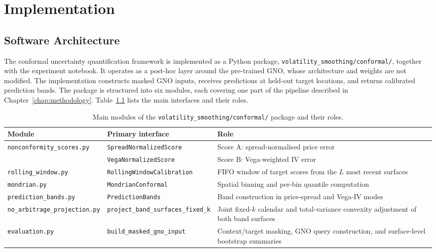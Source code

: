 \chapter{Implementation}
\label{chap:implementation}

\section{Software Architecture}
\label{sec:impl_architecture}

The conformal uncertainty quantification framework is implemented as a Python package, \texttt{volatility\_smoothing/conformal/}, together with the experiment notebook. It operates as a post-hoc layer around the pre-trained GNO, whose architecture and weights are not modified. The implementation constructs masked GNO inputs, receives predictions at held-out target locations, and returns calibrated prediction bands. The package is structured into six modules, each covering one part of the pipeline described in Chapter~\ref{chap:methodology}. Table~\ref{tab:modules} lists the main interfaces and their roles.

\begin{table}[ht]
\centering
\small
\begin{tabularx}{\textwidth}{|>{\raggedright\arraybackslash}p{}|>{\raggedright\arraybackslash}p{}|X|}
\hline
\textbf{Module} & \textbf{Primary interface} & \textbf{Role} \\
\hline
\texttt{nonconformity\_scores.py} & \texttt{SpreadNormalizedScore} & Score A: spread-normalised price error \\
                                  & \texttt{VegaNormalizedScore}  & Score B: Vega-weighted IV error \\
\hline
\texttt{rolling\_window.py}       & \texttt{RollingWindowCalibration} & FIFO window of target scores from the $L$ most recent surfaces \\
\hline
\texttt{mondrian.py}              & \texttt{MondrianConformal}    & Spatial binning and per-bin quantile computation \\
\hline
\texttt{prediction\_bands.py}     & \texttt{PredictionBands}      & Band construction in price-spread and Vega-IV modes \\
\hline
\texttt{no\_arbitrage\_}\newline\texttt{projection.py} & \texttt{project\_band\_surfaces\_}\newline\texttt{fixed\_k} & Joint fixed-$k$ calendar and total-variance convexity adjustment of both band surfaces \\
\hline
\texttt{evaluation.py}            & \texttt{build\_masked\_gno\_input} & Context/target masking, GNO query construction, and surface-level bootstrap summaries \\
\hline
\end{tabularx}
\caption{Main modules of the \texttt{volatility\_smoothing/conformal/} package and their roles.}
\label{tab:modules}
\end{table}

